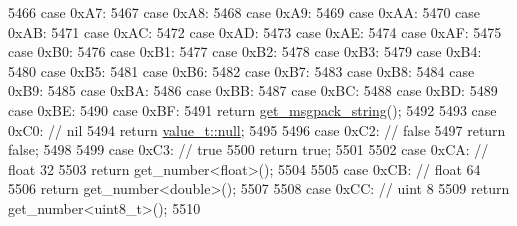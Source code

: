 \begin{DoxyCode}
5466             \textcolor{keywordflow}{case} 0xA7:
5467             \textcolor{keywordflow}{case} 0xA8:
5468             \textcolor{keywordflow}{case} 0xA9:
5469             \textcolor{keywordflow}{case} 0xAA:
5470             \textcolor{keywordflow}{case} 0xAB:
5471             \textcolor{keywordflow}{case} 0xAC:
5472             \textcolor{keywordflow}{case} 0xAD:
5473             \textcolor{keywordflow}{case} 0xAE:
5474             \textcolor{keywordflow}{case} 0xAF:
5475             \textcolor{keywordflow}{case} 0xB0:
5476             \textcolor{keywordflow}{case} 0xB1:
5477             \textcolor{keywordflow}{case} 0xB2:
5478             \textcolor{keywordflow}{case} 0xB3:
5479             \textcolor{keywordflow}{case} 0xB4:
5480             \textcolor{keywordflow}{case} 0xB5:
5481             \textcolor{keywordflow}{case} 0xB6:
5482             \textcolor{keywordflow}{case} 0xB7:
5483             \textcolor{keywordflow}{case} 0xB8:
5484             \textcolor{keywordflow}{case} 0xB9:
5485             \textcolor{keywordflow}{case} 0xBA:
5486             \textcolor{keywordflow}{case} 0xBB:
5487             \textcolor{keywordflow}{case} 0xBC:
5488             \textcolor{keywordflow}{case} 0xBD:
5489             \textcolor{keywordflow}{case} 0xBE:
5490             \textcolor{keywordflow}{case} 0xBF:
5491                 \textcolor{keywordflow}{return} \hyperlink{classnlohmann_1_1detail_1_1binary__reader_aca08d17b5a8230eb6738628934b3b5a5}{get\_msgpack\_string}();
5492 
5493             \textcolor{keywordflow}{case} 0xC0: \textcolor{comment}{// nil}
5494                 \textcolor{keywordflow}{return} \hyperlink{namespacenlohmann_1_1detail_a1ed8fc6239da25abcaf681d30ace4985a37a6259cc0c1dae299a7866489dff0bd}{value\_t::null};
5495 
5496             \textcolor{keywordflow}{case} 0xC2: \textcolor{comment}{// false}
5497                 \textcolor{keywordflow}{return} \textcolor{keyword}{false};
5498 
5499             \textcolor{keywordflow}{case} 0xC3: \textcolor{comment}{// true}
5500                 \textcolor{keywordflow}{return} \textcolor{keyword}{true};
5501 
5502             \textcolor{keywordflow}{case} 0xCA: \textcolor{comment}{// float 32}
5503                 \textcolor{keywordflow}{return} get\_number<float>();
5504 
5505             \textcolor{keywordflow}{case} 0xCB: \textcolor{comment}{// float 64}
5506                 \textcolor{keywordflow}{return} get\_number<double>();
5507 
5508             \textcolor{keywordflow}{case} 0xCC: \textcolor{comment}{// uint 8}
5509                 \textcolor{keywordflow}{return} get\_number<uint8\_t>();
5510 

\end{DoxyCode}
